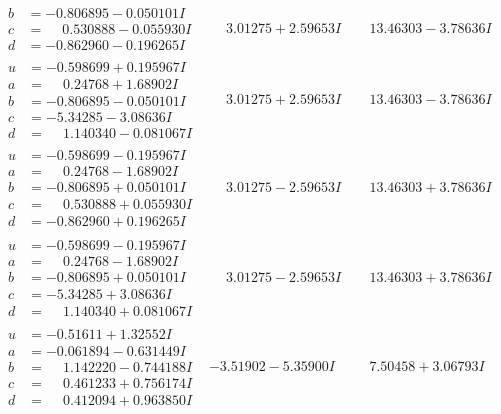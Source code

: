 \documentclass[1p]{elsarticle_modified}
\theoremstyle{definition}
\begin{document}
$$\begin{array}{c|c|c}
\begin{aligned}
b &= -0.806895 - 0.050101 I \\
c &= \phantom{-}0.530888 - 0.055930 I \\
d &= -0.862960 - 0.196265 I\end{aligned}
 & \phantom{-}3.01275 + 2.59653 I & \phantom{-}13.46303 - 3.78636 I \\ \hline\begin{aligned}
u &= -0.598699 + 0.195967 I \\
a &= \phantom{-}0.24768 + 1.68902 I \\
b &= -0.806895 - 0.050101 I \\
c &= -5.34285 - 3.08636 I \\
d &= \phantom{-}1.140340 - 0.081067 I\end{aligned}
 & \phantom{-}3.01275 + 2.59653 I & \phantom{-}13.46303 - 3.78636 I \\ \hline\begin{aligned}
u &= -0.598699 - 0.195967 I \\
a &= \phantom{-}0.24768 - 1.68902 I \\
b &= -0.806895 + 0.050101 I \\
c &= \phantom{-}0.530888 + 0.055930 I \\
d &= -0.862960 + 0.196265 I\end{aligned}
 & \phantom{-}3.01275 - 2.59653 I & \phantom{-}13.46303 + 3.78636 I \\ \hline\begin{aligned}
u &= -0.598699 - 0.195967 I \\
a &= \phantom{-}0.24768 - 1.68902 I \\
b &= -0.806895 + 0.050101 I \\
c &= -5.34285 + 3.08636 I \\
d &= \phantom{-}1.140340 + 0.081067 I\end{aligned}
 & \phantom{-}3.01275 - 2.59653 I & \phantom{-}13.46303 + 3.78636 I \\ \hline\begin{aligned}
u &= -0.51611 + 1.32552 I \\
a &= -0.061894 - 0.631449 I \\
b &= \phantom{-}1.142220 - 0.744188 I \\
c &= \phantom{-}0.461233 + 0.756174 I \\
d &= \phantom{-}0.412094 + 0.963850 I\end{aligned}
 & -3.51902 - 5.35900 I & \phantom{-}7.50458 + 3.06793 I \\ \hline\begin{aligned}

\end{aligned}
\end{array}$$
\end{document}
